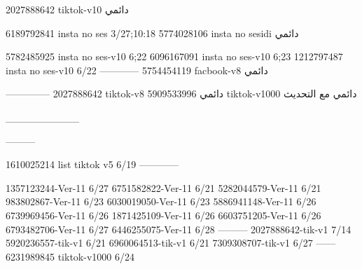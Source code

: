 2027888642 tiktok-v10
دائمي

6189792841 insta no ses
3/27;10:18
5774028106 insta no sesidi
دائمي


5782485925 insta no ses-v10
6;22
6096167091 insta no ses-v10
6;23
1212797487 insta no ses-v10
6/22
------------
5754454119 facbook-v8
دائمي


--------------
2027888642 tiktok-v8
دائمي
5909533996 tiktok-v1000
دائمي مع التحديث

__________

---------

1610025214 list tiktok v5
6/19
------------

1357123244-Ver-11
6/27
6751582822-Ver-11
6/21
5282044579-Ver-11
6/21
983802867-Ver-11
6/23
6030019050-Ver-11
6/23
5886941148-Ver-11
6/26
6739969456-Ver-11
6/26
1871425109-Ver-11
6/26
6603751205-Ver-11
6/26
6793482706-Ver-11
6/27
6446255075-Ver-11
6/28
---------
2027888642-tik-v1
7/14
5920236557-tik-v1
6/21
6960064513-tik-v1
6/21
7309308707-tik-v1
6/27
------
6231989845 tiktok-v1000
6/24
